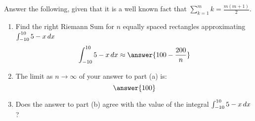\documentclass{ximera}
\author{Gregory Hartman \and Matthew Carr}
\begin{document}
\begin{exercise}




Answer the following, given that it is a well known fact that  $\sum_{k=1}^{m}k=\frac{m(m+1)}{2}$.
\begin{enumerate}
\item		Find the right Riemann Sum for $n$ equally spaced rectangles approximating $\int_{-10}^{10}5-x\,d x$ \[\int_{-10}^{10}5-x\d x\approx\answer{100-\frac{200}{n}}\]
\item		The limit as $n\to\infty$ of your answer to part (a) is: \[\answer{100}\]
\item		Does the answer to part (b) agree with the value of the integral $\int_{-10}^{10}5-x\,d x$? 
\begin{multipleChoice}
\end{multipleChoice}
\end{enumerate}
\end{exercise}
\end{document}
